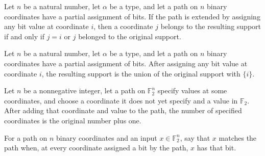 \begin{theorem}
\leanok
{}
Let $n$ be a natural number, let $\alpha$ be a type, and let a path on $n$ binary
coordinates have a partial assignment of bits. If the path is extended by assigning any
bit value at coordinate $i$, then a coordinate $j$ belongs to the resulting support if
and only if $j=i$ or $j$ belonged to the original support.
\end{theorem}

\begin{theorem}
\leanok
{}
Let $n$ be a natural number, let $\alpha$ be a type, and let a path on $n$ binary
coordinates have a partial assignment of bits. After assigning any bit value at
coordinate $i$, the resulting support is the union of the original support with $\{i\}$.
\end{theorem}

\begin{theorem}
\leanok
{}
Let $n$ be a nonnegative integer, let a path on $\mathbb{F}_2^n$ specify values at some
coordinates, and choose a coordinate it does not yet specify and a value in
$\mathbb{F}_2$. After adding that coordinate and value to the path, the number of
specified coordinates is the original number plus one.
\end{theorem}

\begin{definition}
\leanok
{}
For a path on $n$ binary coordinates and an input $x\in\mathbb{F}_2^n$, say that $x$
matches the path when, at every coordinate assigned a bit by the path, $x$ has that bit.
\end{definition}

